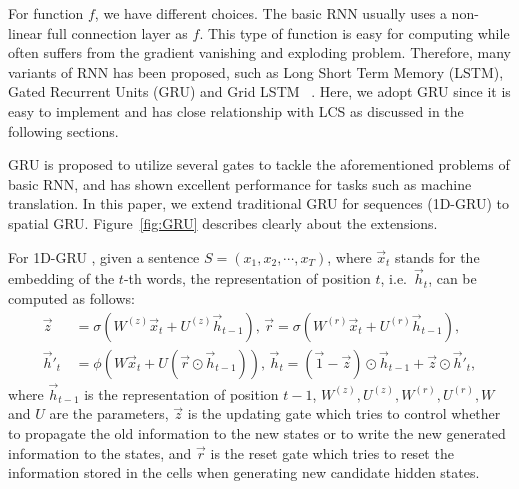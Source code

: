 For function $f$, we have different choices. The basic RNN usually uses a non-linear full connection layer as $f$. This type of function is easy for computing while often suffers from the gradient vanishing and exploding problem. Therefore, many variants of RNN has been proposed, such as Long Short Term Memory (LSTM), Gated Recurrent Units (GRU) and Grid LSTM ~\cite{DBLP:journals/corr/KalchbrennerDG15}. Here, we adopt GRU since it is easy to implement and has close relationship with LCS as discussed in the following sections.

GRU is proposed to utilize several gates to tackle the aforementioned problems of basic RNN, and has shown excellent performance for tasks such as machine translation. In this paper, we extend traditional GRU for sequences (1D-GRU) to spatial GRU. %
Figure~\ref{fig:GRU} describes clearly about the extensions.

For 1D-GRU , given a sentence $S{=}(x_1,x_2,\cdots,x_T)$, where $\vec{x}_t$ stands for the embedding of the $t$-th words, the representation of position $t$, i.e.~$\vec{h}_t$, can be computed as follows:
\begin{equation*}
	\begin{aligned}
		\vec{z} \,& {=} \sigma(W^{(z)}\vec{x}_t + U^{(z)}\vec{h}_{t-1}),\,\vec{r}{=} \sigma(W^{(r)}\vec{x}_t + U^{(r)}\vec{h}_{t-1}), \\
		\vec{h}'_t \,&{=} \phi(W\vec{x}_t{+}U(\vec{r}\odot \vec{h}_{t-1})),\,\vec{h}_t{=} (\vec{1}-\vec{z})\odot \vec{h}_{t-1} {+} \vec{z} \odot \vec{h}'_t,
	\end{aligned}
\end{equation*}
where $\vec{h}_{t-1}$ is the representation of position $t{-}1$, $W^{(z)},U^{(z)},W^{(r)},U^{(r)},W$ and $U$ are the parameters, $\vec{z}$ is the updating gate which tries to control whether to propagate the old information to the new states or to write the new generated information to the states, and $\vec{r}$ is the reset gate which tries to reset the information stored in the cells when generating new candidate hidden states.

